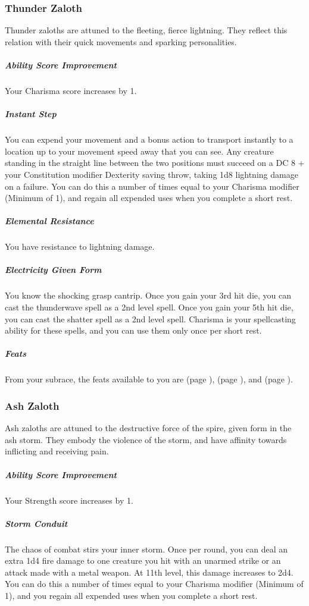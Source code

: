 \subsubsection{Thunder Zaloth}
    Thunder zaloths are attuned to the fleeting, fierce lightning.
    They reflect this relation with their quick movements and sparking personalities.

    \subparagraph{Ability Score Improvement} Your Charisma score increases by 1.

    \subparagraph{Instant Step} You can expend your movement and a bonus action to transport instantly to a location up to your movement speed away that you can see.
    Any creature standing in the straight line between the two positions must succeed on a DC 8 + your Constitution modifier Dexterity saving throw, taking 1d8 lightning damage on a failure.
    You can do this a number of times equal to your Charisma modifier (Minimum of 1), and regain all expended uses when you complete a short rest.

    \subparagraph{Elemental Resistance} You have resistance to lightning damage.

    \subparagraph{Electricity Given Form} You know the shocking grasp cantrip.
    Once you gain your 3rd hit die, you can cast the thunderwave spell as a 2nd level spell.
    Once you gain your 5th hit die, you can cast the shatter spell as a 2nd level spell.
    Charisma is your spellcasting ability for these spells, and you can use them only once per short rest.

    \subparagraph{Feats} From your subrace, the feats available to you are
    \textbf{} (page \pageref{feat::}),
    \textbf{} (page \pageref{feat::}), and
    \textbf{} (page \pageref{feat::}).

\subsubsection{Ash Zaloth}
    Ash zaloths are attuned to the destructive force of the spire, given form in the ash storm.
    They embody the violence of the storm, and have affinity towards inflicting and receiving pain.

    \subparagraph{Ability Score Improvement} Your Strength score increases by 1.

    \subparagraph{Storm Conduit} The chaos of combat stirs your inner storm.
    Once per round, you can deal an extra 1d4 fire damage to one creature you hit with an unarmed strike or an attack made with a metal weapon.
    At 11th level, this damage increases to 2d4.
    You can do this a number of times equal to your Charisma modifier (Minimum of 1), and you regain all expended uses when you complete a short rest.

